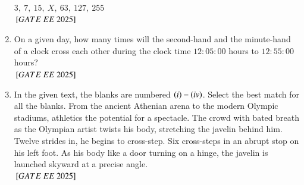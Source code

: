 \documentclass[journal,12pt,onecolumn]{IEEEtran}
\theoremstyle{remark}
\begin{document}
\begin{enumerate}
$3,\ 7,\ 15,\ X,\ 63,\ 127,\ 255$
\\
\hfill ${}\left[GATE\ EE\ 2025\right]$
    \begin{enumerate}
    \end{enumerate}
\item  On a given day, how many times will the second-hand and the minute-hand of a clock cross each other during the clock time $12:05:00$ hours to $12:55:00$ hours?\\
\hfill ${}\left[GATE\ EE\ 2025\right]$
    \begin{enumerate}
    \end{enumerate}
\item In the given text, the blanks are numbered $\left(i\right)- \left(iv\right)$. Select the best match for all the blanks.
From the ancient Athenian arena to the modern Olympic stadiums, athletics \underline{} the potential for a spectacle. The crowd \underline{} with bated breath as the Olympian artist twists his body, stretching the javelin behind him. Twelve strides in, he begins to cross-step. Six cross-steps \underline{} in an abrupt stop on his left foot. As his body \underline{} like a door turning on a hinge, the javelin is launched skyward at a precise angle. \\   
\hfill ${}\left[GATE\ EE\ 2025\right]$
    \begin{enumerate}
\end{enumerate}
\end{enumerate}
\end{document}
